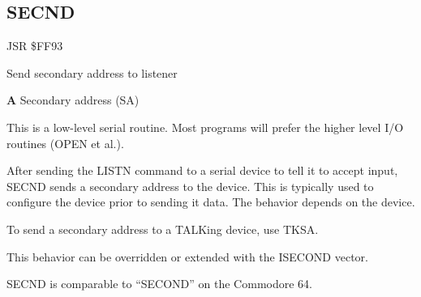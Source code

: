 \subsection{SECND}
\label{KERNAL Jump Table!SECND}
\begin{description}[leftmargin=2cm,style=nextline]
    \item [Address:] JSR \$FF93
    \item [Description:] Send secondary address to listener
    \item [Inputs:]
        \textbf{A} Secondary address (SA)
    \item [Remarks:]
        This is a low-level serial routine. Most programs will prefer the higher level I/O routines (OPEN et al.).

        After sending the LISTN command to a serial device to tell it to accept input, SECND sends a secondary address to the device. This is typically used to configure the device prior to sending it data. The behavior depends on the device.

        To send a secondary address to a TALKing device, use TKSA.

        This behavior can be overridden or extended with the ISECOND vector.

        SECND is comparable to ``SECOND'' on the Commodore 64.

    \item [Example:]
\end{description}



\newpage
